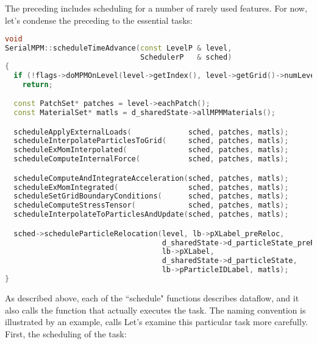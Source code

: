 The preceding includes scheduling for a number of rarely used features.
For now, let's condense the preceding to the essential tasks:

\begin{lstlisting}[language=Cpp]
void
SerialMPM::scheduleTimeAdvance(const LevelP & level,
                               SchedulerP   & sched)
{
  if (!flags->doMPMOnLevel(level->getIndex(), level->getGrid()->numLevels()))
    return;

  const PatchSet* patches = level->eachPatch();
  const MaterialSet* matls = d_sharedState->allMPMMaterials();

  scheduleApplyExternalLoads(             sched, patches, matls);
  scheduleInterpolateParticlesToGrid(     sched, patches, matls);
  scheduleExMomInterpolated(              sched, patches, matls);
  scheduleComputeInternalForce(           sched, patches, matls);

  scheduleComputeAndIntegrateAcceleration(sched, patches, matls);
  scheduleExMomIntegrated(                sched, patches, matls);
  scheduleSetGridBoundaryConditions(      sched, patches, matls);
  scheduleComputeStressTensor(            sched, patches, matls);
  scheduleInterpolateToParticlesAndUpdate(sched, patches, matls);

  sched->scheduleParticleRelocation(level, lb->pXLabel_preReloc,
                                    d_sharedState->d_particleState_preReloc,
                                    lb->pXLabel,
                                    d_sharedState->d_particleState,
                                    lb->pParticleIDLabel, matls);
}
\end{lstlisting}

As described above, each of the ``schedule" functions describes
dataflow, and it also calls the function that actually executes the
task.  The naming convention is illustrated by an example, 
 calls 
 Let's examine this
particular task more carefully.  First, the scheduling of the
task:

